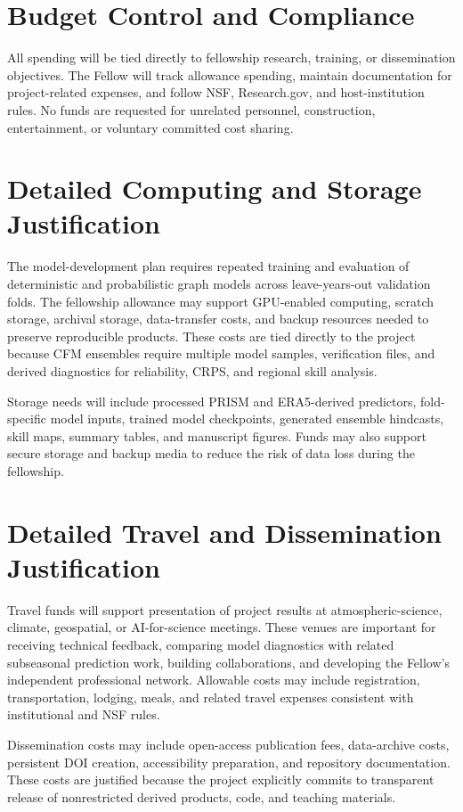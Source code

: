 \documentclass[11pt,letterpaper]{article}
\begin{document}
\section*{Budget Control and Compliance}
All spending will be tied directly to fellowship research, training, or dissemination objectives. The Fellow will track allowance spending, maintain documentation for project-related expenses, and follow NSF, Research.gov, and host-institution rules. No funds are requested for unrelated personnel, construction, entertainment, or voluntary committed cost sharing.

\newpage
\section*{Detailed Computing and Storage Justification}
The model-development plan requires repeated training and evaluation of deterministic and probabilistic graph models across leave-years-out validation folds. The fellowship allowance may support GPU-enabled computing, scratch storage, archival storage, data-transfer costs, and backup resources needed to preserve reproducible products. These costs are tied directly to the project because CFM ensembles require multiple model samples, verification files, and derived diagnostics for reliability, CRPS, and regional skill analysis.

Storage needs will include processed PRISM and ERA5-derived predictors, fold-specific model inputs, trained model checkpoints, generated ensemble hindcasts, skill maps, summary tables, and manuscript figures. Funds may also support secure storage and backup media to reduce the risk of data loss during the fellowship.

\newpage
\section*{Detailed Travel and Dissemination Justification}
Travel funds will support presentation of project results at atmospheric-science, climate, geospatial, or AI-for-science meetings. These venues are important for receiving technical feedback, comparing model diagnostics with related subseasonal prediction work, building collaborations, and developing the Fellow's independent professional network. Allowable costs may include registration, transportation, lodging, meals, and related travel expenses consistent with institutional and NSF rules.

Dissemination costs may include open-access publication fees, data-archive costs, persistent DOI creation, accessibility preparation, and repository documentation. These costs are justified because the project explicitly commits to transparent release of nonrestricted derived products, code, and teaching materials.
\end{document}

